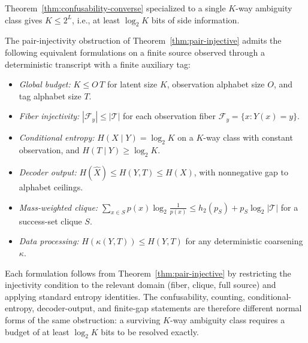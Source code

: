 \begin{corollary}\label{thm:fano-converse}
Theorem~\ref{thm:confusability-converse} specialized to a single $K$-way ambiguity class gives $K \le 2^L$, i.e., at least $\log_2 K$ bits of side information.
\end{corollary}

\begin{proposition}\label{prop:equivalent-formulations}
The pair-injectivity obstruction of Theorem~\ref{thm:pair-injective} admits the following equivalent formulations on a finite source observed through a deterministic transcript with a finite auxiliary tag:
\begin{itemize}
\tightlist
\item \emph{Global budget:} $K \le O\,T$ for latent size $K$, observation alphabet size $O$, and tag alphabet size $T$.
\item \emph{Fiber injectivity:} $|\mathcal F_y| \le |\mathcal T|$ for each observation fiber $\mathcal F_y=\{x : Y(x)=y\}$.
\item \emph{Conditional entropy:} $H(X \mid Y) = \log_2 K$ on a $K$-way class with constant observation, and $H(T \mid Y) \ge \log_2 K$.
\item \emph{Decoder output:} $H(\hat X) \le H(Y,T) \le H(X)$, with nonnegative gap to alphabet ceilings.
\item \emph{Mass-weighted clique:} $\sum_{x\in S} p(x)\log_2 \frac{1}{p(x)} \le h_2(p_S) + p_S \log_2 |\mathcal T|$ for a success-set clique $S$.
\item \emph{Data processing:} $H(\kappa(Y,T)) \le H(Y,T)$ for any deterministic coarsening $\kappa$.
\end{itemize}

Each formulation follows from Theorem~\ref{thm:pair-injective} by restricting the injectivity condition to the relevant domain (fiber, clique, full source) and applying standard entropy identities. The confusability, counting, conditional-entropy, decoder-output, and finite-gap statements are therefore different normal forms of the same obstruction: a surviving $K$-way ambiguity class requires a budget of at least $\log_2 K$ bits to be resolved exactly.
\end{proposition}

